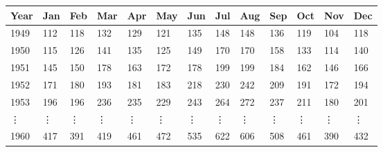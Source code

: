 \begin{tabular}{l|llllllllllll}
\toprule 
Year & Jan & Feb & Mar & Apr & May & Jun & Jul & Aug & Sep & Oct & Nov & Dec \\
\hline 
1949 & 112 & 118 & 132 & 129 & 121 & 135 & 148 & 148 & 136 & 119 & 104 & 118 \\
1950 & 115 & 126 & 141 & 135 & 125 & 149 & 170 & 170 & 158 & 133 & 114 & 140 \\
1951 & 145 & 150 & 178 & 163 & 172 & 178 & 199 & 199 & 184 & 162 & 146 & 166 \\
1952 & 171 & 180 & 193 & 181 & 183 & 218 & 230 & 242 & 209 & 191 & 172 & 194 \\
1953 & 196 & 196 & 236 & 235 & 229 & 243 & 264 & 272 & 237 & 211 & 180 & 201 \\
\vdots & \vdots & \vdots & \vdots & \vdots & \vdots & \vdots & \vdots & \vdots & \vdots & \vdots & \vdots & \vdots \\
1960 & 417 & 391 & 419 & 461 & 472 & 535 & 622 & 606 & 508 & 461 & 390 & 432 \\
\bottomrule 
\end{tabular}
